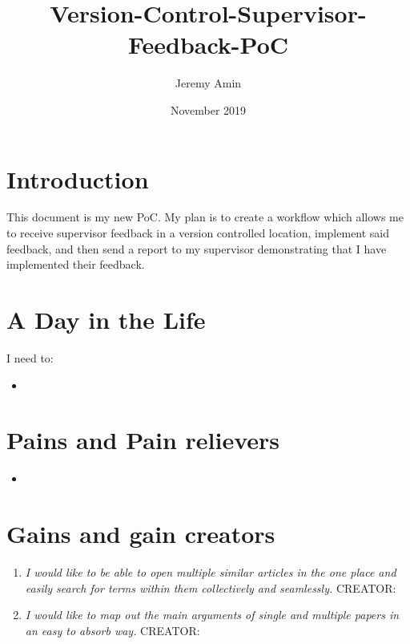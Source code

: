 \documentclass{article}
\title{Version-Control-Supervisor-Feedback-PoC}
\author{Jeremy Amin}
\date{November 2019}
\begin{document}
\maketitle

\section{Introduction}

This document is my new PoC. My plan is to create a workflow which allows me to receive supervisor feedback in a version controlled location, implement said feedback, and then send a report to my supervisor demonstrating that I have implemented their feedback.

\section{A Day in the Life}

I need to:
\begin{itemize}
    \item 
\end{itemize}

\section{Pains and Pain relievers}

\begin{itemize}
    \item \textit{}
\end{itemize}

\section{Gains and gain creators}

\begin{enumerate}
\item  \textit {I would like to be able to open multiple similar articles in the one place and easily search for terms within them collectively and seamlessly.} CREATOR: 
\item \textit {I would like to map out the main arguments of single and multiple papers in an easy to absorb way.} CREATOR: 
\end{enumerate}
\end{document}
